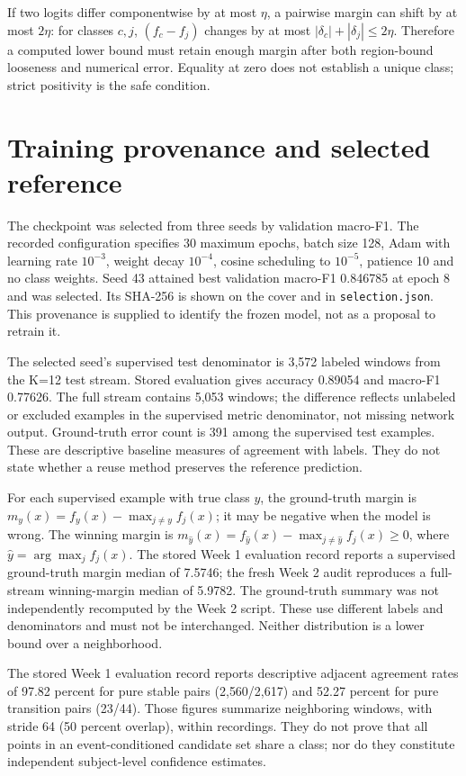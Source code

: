 \documentclass[11pt,a4paper]{article}
\newcommand{\code}[1]{{\small\ttfamily\nolinkurl{#1}}}
\begin{document}
If two logits differ componentwise by at most $\eta$, a pairwise margin can shift by at most $2\eta$: for classes $c,j$, $(f_c-f_j)$ changes by at most $|\delta_c|+|\delta_j|\le2\eta$. Therefore a computed lower bound must retain enough margin after both region-bound looseness and numerical error. Equality at zero does not establish a unique class; strict positivity is the safe condition.

\section{Training provenance and selected reference}
The checkpoint was selected from three seeds by validation macro-F1. The recorded configuration specifies 30 maximum epochs, batch size 128, Adam with learning rate $10^{-3}$, weight decay $10^{-4}$, cosine scheduling to $10^{-5}$, patience 10 and no class weights. Seed 43 attained best validation macro-F1 0.846785 at epoch 8 and was selected. Its SHA-256 is shown on the cover and in \code{selection.json}. This provenance is supplied to identify the frozen model, not as a proposal to retrain it.

The selected seed's supervised test denominator is 3,572 labeled windows from the K=12 test stream. Stored evaluation gives accuracy 0.89054 and macro-F1 0.77626. The full stream contains 5,053 windows; the difference reflects unlabeled or excluded examples in the supervised metric denominator, not missing network output. Ground-truth error count is 391 among the supervised test examples. These are descriptive baseline measures of agreement with labels. They do not state whether a reuse method preserves the reference prediction.

For each supervised example with true class $y$, the ground-truth margin is $m_y(x)=f_y(x)-\max_{j\ne y}f_j(x)$; it may be negative when the model is wrong. The winning margin is $m_{\hat y}(x)=f_{\hat y}(x)-\max_{j\ne\hat y}f_j(x)\ge0$, where $\hat y=\arg\max_j f_j(x)$. The stored Week 1 evaluation record reports a supervised ground-truth margin median of 7.5746; the fresh Week 2 audit reproduces a full-stream winning-margin median of 5.9782. The ground-truth summary was not independently recomputed by the Week 2 script. These use different labels and denominators and must not be interchanged. Neither distribution is a lower bound over a neighborhood.

The stored Week 1 evaluation record reports descriptive adjacent agreement rates of 97.82 percent for pure stable pairs (2,560/2,617) and 52.27 percent for pure transition pairs (23/44). Those figures summarize neighboring windows, with stride 64 (50 percent overlap), within recordings. They do not prove that all points in an event-conditioned candidate set share a class; nor do they constitute independent subject-level confidence estimates.
\end{document}
